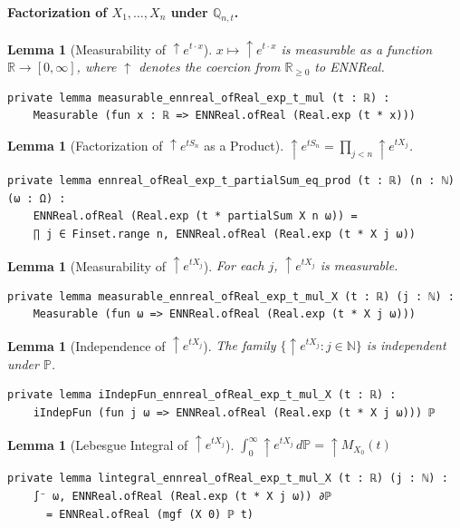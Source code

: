\documentclass{article}
\newtheorem{lemma}[theorem]{Lemma}
\renewcommand{\P}{\mathbb{P}}
\newcommand{\Q}{\mathbb{Q}}
\newcommand{\R}{\mathbb{R}}
\newcommand{\N}{\mathbb{N}}
\begin{document}
\paragraph{Factorization of $X_1, \ldots, X_n$ under $\Q_{n,t}$.}

\begin{lemma}[Measurability of $\uparrow e^{t \cdot x}$]
  $x \mapsto \uparrow e^{t \cdot x}$ is measurable as a function $\R \to [0, \infty]$, where
  $\uparrow$ denotes the coercion from $\R_{\ge 0}$ to ENNReal.
\end{lemma}
\begin{lstlisting}
private lemma measurable_ennreal_ofReal_exp_t_mul (t : ℝ) :
    Measurable (fun x : ℝ => ENNReal.ofReal (Real.exp (t * x)))
\end{lstlisting}
\begin{lemma}[Factorization of $\uparrow e^{t S_n}$ as a Product]
  $\uparrow e^{t S_n} = \prod_{j < n} \uparrow e^{t X_j}$.
\end{lemma}
\begin{lstlisting}
private lemma ennreal_ofReal_exp_t_partialSum_eq_prod (t : ℝ) (n : ℕ) (ω : Ω) :
    ENNReal.ofReal (Real.exp (t * partialSum X n ω)) =
    ∏ j ∈ Finset.range n, ENNReal.ofReal (Real.exp (t * X j ω))
\end{lstlisting}
\begin{lemma}[Measurability of $\uparrow e^{t X_j}$]
  For each $j$, $\uparrow e^{t X_j}$ is measurable.
\end{lemma}
\begin{lstlisting}
private lemma measurable_ennreal_ofReal_exp_t_mul_X (t : ℝ) (j : ℕ) :
    Measurable (fun ω => ENNReal.ofReal (Real.exp (t * X j ω)))
\end{lstlisting}
\begin{lemma}[Independence of $\uparrow e^{t X_j}$]
  The family $\{\uparrow e^{t X_j} : j \in \N\}$ is independent under $\P$.
\end{lemma}
\begin{lstlisting}
private lemma iIndepFun_ennreal_ofReal_exp_t_mul_X (t : ℝ) :
    iIndepFun (fun j ω => ENNReal.ofReal (Real.exp (t * X j ω))) ℙ
\end{lstlisting}
\begin{lemma}[Lebesgue Integral of $\uparrow e^{t X_j}$]
  $\int_0^\infty \uparrow e^{t X_j} \, d\P = \uparrow M_{X_0}(t)$
\end{lemma}
\begin{lstlisting}
private lemma lintegral_ennreal_ofReal_exp_t_mul_X (t : ℝ) (j : ℕ) :
    ∫⁻ ω, ENNReal.ofReal (Real.exp (t * X j ω)) ∂ℙ
      = ENNReal.ofReal (mgf (X 0) ℙ t)
\end{lstlisting}
\end{document}
